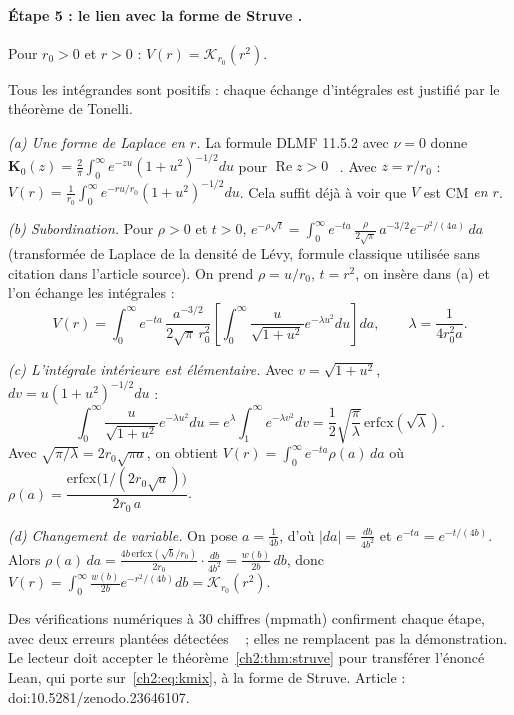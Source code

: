 \paragraph{Étape 5 : le lien avec la forme de Struve \tierC.}
\begin{theorem}\label{ch2:thm:struve}
Pour $r_0>0$ et $r>0$ : $V(r)=\mathcal K_{r_0}(r^2)$.
\end{theorem}
\begin{humanproof}
Tous les intégrandes sont positifs : chaque échange d'intégrales est justifié par le théorème de Tonelli.

\emph{(a) Une forme de Laplace en $r$.} La formule DLMF 11.5.2 avec $\nu=0$ donne
$\mathbf K_0(z)=\frac2\pi\int_0^\infty e^{-zu}(1+u^2)^{-1/2}du$ pour $\operatorname{Re}z>0$ \tierL~\cite{ch2dlmf}. Avec
$z=r/r_0$ : $V(r)=\frac1{r_0}\int_0^\infty e^{-ru/r_0}(1+u^2)^{-1/2}du$. Cela suffit déjà à voir que $V$ est CM \emph{en $r$}.

\emph{(b) Subordination.} Pour $\rho>0$ et $t>0$,
$e^{-\rho\sqrt t}=\int_0^\infty e^{-ta}\,\frac{\rho}{2\sqrt\pi}\,a^{-3/2}e^{-\rho^2/(4a)}\,da$ (transformée de Laplace de
la densité de Lévy, formule classique utilisée sans citation dans l'article source). On prend $\rho=u/r_0$, $t=r^2$, on
insère dans (a) et l'on échange les intégrales :
\[V(r)=\int_0^\infty e^{-ta}\,\frac{a^{-3/2}}{2\sqrt\pi\,r_0^2}\left[\int_0^\infty\frac{u}{\sqrt{1+u^2}}e^{-\lambda u^2}du\right]da,
\qquad\lambda=\frac1{4r_0^2a}.\]

\emph{(c) L'intégrale intérieure est élémentaire.} Avec $v=\sqrt{1+u^2}$, $dv=u(1+u^2)^{-1/2}du$ :
\[\int_0^\infty\frac{u}{\sqrt{1+u^2}}e^{-\lambda u^2}du=e^{\lambda}\int_1^\infty e^{-\lambda v^2}dv
=\frac12\sqrt{\frac\pi\lambda}\,\mathrm{erfcx}(\sqrt\lambda).\]
Avec $\sqrt{\pi/\lambda}=2r_0\sqrt{\pi a}$, on obtient $V(r)=\int_0^\infty e^{-ta}\rho(a)\,da$ où
$\rho(a)=\dfrac{\mathrm{erfcx}\bigl(1/(2r_0\sqrt a)\bigr)}{2r_0\,a}$.

\emph{(d) Changement de variable.} On pose $a=\frac1{4b}$, d'où $|da|=\frac{db}{4b^2}$ et $e^{-ta}=e^{-t/(4b)}$. Alors
$\rho(a)\,da=\frac{4b\,\mathrm{erfcx}(\sqrt b/r_0)}{2r_0}\cdot\frac{db}{4b^2}=\frac{w(b)}{2b}\,db$, donc
$V(r)=\int_0^\infty\frac{w(b)}{2b}e^{-r^2/(4b)}db=\mathcal K_{r_0}(r^2)$.
\end{humanproof}
\noindent Des vérifications numériques à 30 chiffres (mpmath) confirment chaque étape, avec deux erreurs plantées
détectées \tierX~\cite{ch2kel} ; elles ne remplacent pas la démonstration. Le lecteur doit accepter le
théorème~\ref{ch2:thm:struve} pour transférer l'énoncé Lean, qui porte sur~\eqref{ch2:eq:kmix}, à la forme de Struve.
Article : doi\string:10.5281/zenodo.23646107.

